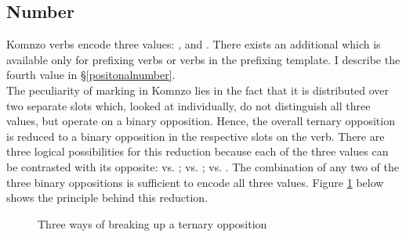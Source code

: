 \subsection{Number} \label{numbersubsec}

Komnzo verbs encode three  values: ,  and . There exists an additional  which is available only for prefixing verbs or verbs in the prefixing template. I describe the fourth  value in \S{}\ref{positonalnumber}.\\

The peculiarity of  marking in Komnzo lies in the fact that it is distributed over two separate slots which, looked at individually, do not distinguish all three values, but operate on a binary opposition. Hence, the overall ternary  opposition is reduced to a binary opposition in the respective slots on the verb. There are three logical possibilities for this reduction because each of the three  values can be contrasted with its opposite:  vs. ;  vs. ;  vs. . The combination of any two of the three binary oppositions is sufficient to encode all three  values. Figure \ref{ternbinary} below shows the principle behind this reduction.

\begin{figure}[H]
\centering
{}
\caption{Three ways of breaking up a ternary opposition}\label{ternbinary}
\end{figure}%

